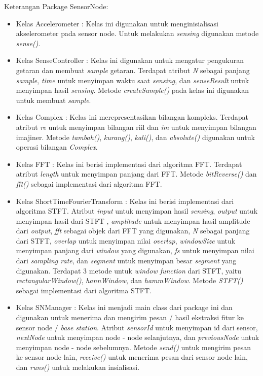 \newpage
Keterangan Package SensorNode:
\begin{itemize}
	\item Kelas Accelerometer : Kelas ini digunakan untuk menginisialisasi akselerometer pada sensor node. Untuk melakukan {\it sensing} digunakan metode {\it sense()}.
	\item Kelas SenseController : Kelas ini digunakan untuk mengatur pengukuran getaran dan membuat {\it sample} getaran. Terdapat atribut {\it N} sebagai panjang {\it sample}, {\it time} untuk menyimpan waktu saat {\it sensing}, dan {\it senseResult} untuk menyimpan hasil {\it sensing}. Metode {\it createSample()} pada kelas ini digunakan untuk membuat {\it sample}.
	\item Kelas Complex : Kelas ini merepresentasikan bilangan kompleks. Terdapat atribut {\it re} untuk menyimpan bilangan riil dan {\it im} untuk menyimpan bilangan imajiner. Metode {\it tambah()}, {\it kurang()}, {\it kali()}, dan {\it absolute()} digunakan untuk operasi bilangan {\it Complex}.
	\item Kelas FFT : Kelas ini berisi implementasi dari algoritma FFT. Terdapat atribut {\it length} untuk menyimpan panjang dari FFT. Metode {\it bitReverse()} dan {\it fft()} sebagai implementasi dari algoritma FFT.
	\item Kelas ShortTimeFourierTransform : Kelas ini berisi implementasi dari algoritma STFT. Atribut {\it input} untuk menyimpan hasil {\it sensing}, {\it output} untuk menyimpan hasil dari STFT , {\it amplitude} untuk menyimpan hasil amplitude dari {\it output}, {\it fft} sebagai objek dari FFT yang digunakan, {\it N} sebagai panjang dari STFT, {\it overlap} untuk menyimpan nilai {\it overlap}, {\it windowSize} untuk menyimpan panjang dari {\it window} yang digunakan, {\it fs} untuk menyimpan nilai dari {\it sampling rate}, dan {\it segment} untuk menyimpan besar {\it segment} yang digunakan. Terdapat 3 metode untuk {\it window function} dari STFT, yaitu {\it rectangularWindow()}, {\it hannWindow}, dan {\it hammWindow}. Metode {\it STFT()} sebagai implementasi dari algoritma STFT.
	\item Kelas SNManager : Kelas ini menjadi main class dari package ini dan digunakan untuk menerima dan mengirim pesan /  hasil ekstraksi fitur ke sensor node / {\it base station}. Atribut {\it sensorId} untuk menyimpan id dari sensor, {\it nextNode} untuk menyimpan node - node selanjutnya, dan {\it previousNode} untuk menyimpan node - node sebelumnya. Metode {\it send()} untuk mengirim pesan ke sensor node lain, {\it receive()} untuk menerima pesan dari sensor node lain, dan {\it runs()} untuk melakukan insialisasi.
\end{itemize}

